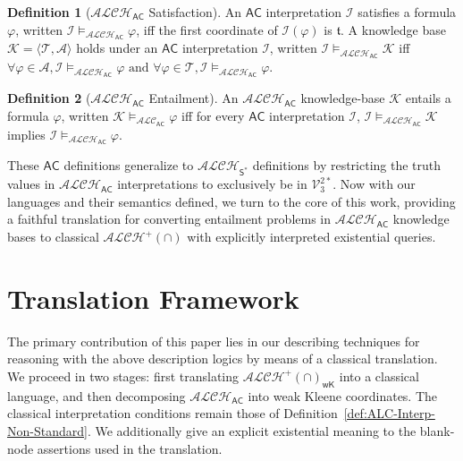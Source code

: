 \documentclass[letterpaper]{article} %
\theoremstyle{definition}
\theoremstyle{definition}
\newtheorem{definition}{Definition}
\theoremstyle{definition}
\theoremstyle{definition}
\theoremstyle{definition}
\newcommand{\vt}{\mathfrak{t}}
\begin{document}
\begin{definition}[$\mathcal{ALCH}_\mathsf{AC}$ Satisfaction]\label{def:AC-Sat}
    An $\mathsf{AC}$ interpretation $\mathcal{I}$ satisfies a formula $\varphi$, written $\mathcal{I}\models_{\mathcal{ALCH}_\mathsf{AC}}\varphi$, iff the first coordinate of $\mathcal{I}(\varphi)$ is $\vt$. A knowledge base $\mathcal{K} = \langle \mathcal{T},\mathcal{A}\rangle$ holds under an $\mathsf{AC}$ interpretation $\mathcal{I}$, written $\mathcal{I}\models_{\mathcal{ALCH}_\mathsf{AC}}\mathcal{K}$ iff $\forall \varphi \in \mathcal{A}, \mathcal{I}\models_{\mathcal{ALCH}_\mathsf{AC}}\varphi \text{ and } \forall \varphi \in \mathcal{T}, \mathcal{I}\models_{\mathcal{ALCH}_\mathsf{AC}}\varphi$. 
\end{definition}
\begin{definition}[$\mathcal{ALCH}_\mathsf{AC}$ Entailment]\label{def:AC-Ent}
An $\mathcal{ALCH}_\mathsf{AC}$ knowledge-base $\mathcal{K}$ entails a formula $\varphi$, written $\mathcal{K} \models_{\mathcal{ALC}_{\mathsf{AC}}} \varphi$ iff for every $\mathsf{AC}$ interpretation $\mathcal{I}$, $\mathcal{I}\models_{\mathcal{ALCH}_\mathsf{AC}}\mathcal{K}$ implies $\mathcal{I}\models_{\mathcal{ALCH}_\mathsf{AC}}\varphi$.
\end{definition}
These $\mathsf{AC}$ definitions generalize to $\mathcal{ALCH}_{\mathsf{S}^*}$ definitions by restricting the truth values in $\mathcal{ALCH}_\mathsf{AC}$ interpretations to exclusively be in $\mathcal{V}_3^{2*}$. Now with our languages and their semantics defined, we turn to the core of this work, providing a faithful translation for converting entailment problems in $\mathcal{ALCH}_\mathsf{AC}$ knowledge bases to classical $\mathcal{ALCH^+(\cap)}$ with explicitly interpreted existential queries.  

\section{Translation Framework}

The primary contribution of this paper lies in our describing techniques for reasoning with the above description logics by means of a classical translation. We proceed in two stages: first translating $\mathcal{ALCH}^{+}(\cap)_{\mathsf{wK}}$ into a classical language, and then decomposing $\mathcal{ALCH}_{\mathsf{AC}}$ into weak Kleene coordinates. The classical interpretation conditions remain those of Definition~\ref{def:ALC-Interp-Non-Standard}. We additionally give an explicit existential meaning to the blank-node assertions used in the translation.
\end{document}
